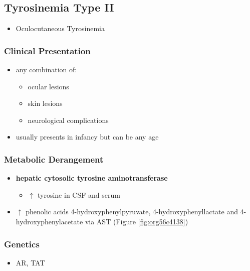\documentclass{scrartcl}
\begin{document}
\subsection{Tyrosinemia Type II}
\label{sec:org38ef0bf}
\begin{itemize}
\item Oculocutaneous Tyrosinemia
\end{itemize}
\subsubsection{Clinical Presentation}
\label{sec:orgd58ca5b}
\begin{itemize}
\item any combination of: 
\begin{itemize}
\item ocular lesions
\item skin lesions
\item neurological complications
\end{itemize}
\item usually presents in infancy but can be any age
\end{itemize}

\subsubsection{Metabolic Derangement}
\label{sec:org670107a}
\begin{itemize}
\item \textbf{hepatic cytosolic tyrosine aminotransferase}
\begin{itemize}
\item \(\uparrow\) tyrosine in CSF and serum
\end{itemize}
\item \(\uparrow\) phenolic acids 4-hydroxyphenylpyruvate,
4-hydroxyphenyllactate and 4-hydroxyphenylacetate via AST (Figure \ref{fig:org56c4138})
\end{itemize}

\subsubsection{Genetics}
\label{sec:org4a9e9d2}
\begin{itemize}
\item AR, TAT
\end{itemize}
\end{document}
